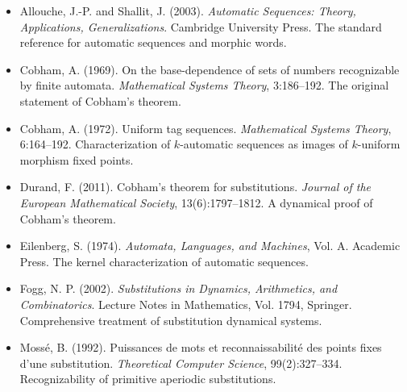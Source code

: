 \begin{itemize}
  \item Allouche, J.-P. and Shallit, J. (2003). \textit{Automatic Sequences: Theory, Applications, Generalizations}. Cambridge University Press. The standard reference for automatic sequences and morphic words.
\end{itemize}

\begin{itemize}
  \item Cobham, A. (1969). On the base-dependence of sets of numbers recognizable by finite automata. \textit{Mathematical Systems Theory}, 3:186--192. The original statement of Cobham's theorem.
\end{itemize}

\begin{itemize}
  \item Cobham, A. (1972). Uniform tag sequences. \textit{Mathematical Systems Theory}, 6:164--192. Characterization of $k$-automatic sequences as images of $k$-uniform morphism fixed points.
\end{itemize}

\begin{itemize}
  \item Durand, F. (2011). Cobham's theorem for substitutions. \textit{Journal of the European Mathematical Society}, 13(6):1797--1812. A dynamical proof of Cobham's theorem.
\end{itemize}

\begin{itemize}
  \item Eilenberg, S. (1974). \textit{Automata, Languages, and Machines}, Vol. A. Academic Press. The kernel characterization of automatic sequences.
\end{itemize}

\begin{itemize}
  \item Fogg, N. P. (2002). \textit{Substitutions in Dynamics, Arithmetics, and Combinatorics}. Lecture Notes in Mathematics, Vol. 1794, Springer. Comprehensive treatment of substitution dynamical systems.
\end{itemize}

\begin{itemize}
  \item Mossé, B. (1992). Puissances de mots et reconnaissabilité des points fixes d'une substitution. \textit{Theoretical Computer Science}, 99(2):327--334. Recognizability of primitive aperiodic substitutions.
\end{itemize}

